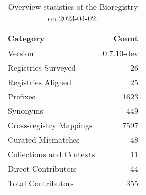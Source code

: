 \begin{table}
\centering
\caption{Overview statistics of the Bioregistry on 2023-04-02.}
\label{tab:bioregistry-summary}
\begin{tabular}{lr}
\toprule
                Category &      Count \\
\midrule
                 Version & 0.7.10-dev \\
     Registries Surveyed &         26 \\
      Registries Aligned &         25 \\
                Prefixes &       1623 \\
                Synonyms &        449 \\
 Cross-registry Mappings &       7597 \\
      Curated Mismatches &         48 \\
Collections and Contexts &         11 \\
     Direct Contributors &         44 \\
      Total Contributors &        355 \\
\bottomrule
\end{tabular}
\end{table}

